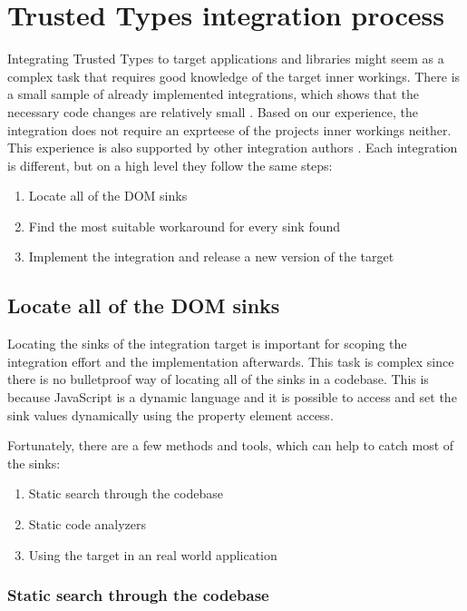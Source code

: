 \chapter{Trusted Types integration process}
\label{tt_integration_setup}

Integrating Trusted Types to target applications and libraries might seem as a complex task that
requires good knowledge of the target inner workings. There is a small sample of already implemented
integrations, which shows that the necessary code changes are relatively small
\cite{tt_integration_list}. Based on our experience, the integration does not require an exprteese
of the projects inner workings neither. This experience is also supported by other integration
authors \cite{tt_web_framework_paper}. Each integration is different, but on a high level they
follow the same steps:

\begin{enumerate}
  \item Locate all of the DOM sinks
  \item Find the most suitable workaround for every sink found
  \item Implement the integration and release a new version of the target
\end{enumerate}

\section{Locate all of the DOM sinks}

Locating the sinks of the integration target is important for scoping the integration effort and the
implementation afterwards. This task is complex since there is no bulletproof way of locating all of
the sinks in a codebase. This is because JavaScript is a dynamic language and it is possible to
access and set the sink values dynamically using the property element access.

Fortunately, there are a few methods and tools, which can help to catch most of the sinks:

\begin{enumerate}
  \item Static search through the codebase
  \item Static code analyzers
  \item Using the target in an real world application
\end{enumerate}

\subsection{Static search through the codebase}

